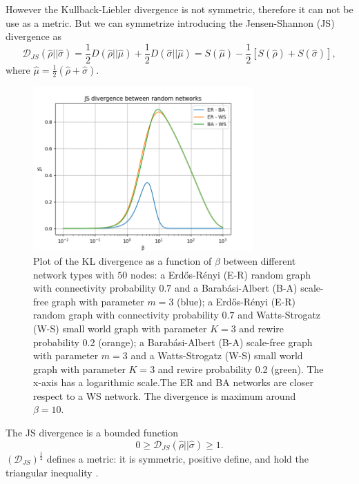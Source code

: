 However the Kullback-Liebler divergence is not symmetric, therefore it can not be use as a metric. 
But we can symmetrize introducing the Jensen-Shannon (JS) divergence \cite{J-S_divergence} as
\begin{equation}\label{JS_metric}
    \mathcal{D}_{JS}(\hat\rho||\hat\sigma) =  \frac{1}{2}D(\hat \rho || \hat \mu) + \frac{1}{2}D(\hat \sigma || \hat \mu) = S(\hat\mu)-\frac{1}{2}\left[S(\hat\rho) + S(\hat\sigma)\right],
\end{equation}
where $\hat\mu =\frac{1}{2}(\hat\rho+\hat\sigma)$. 
\begin{figure}[ht!]
    \centering
    \includegraphics[width=0.75\textwidth]{image/JS_divergence.png}
    \caption{Plot of the KL divergence as a function of $\beta$ between different network types with $50$ nodes: a Erd\H{o}s-Rényi (E-R) random graph with connectivity probability $0.7$ and a Barab\'asi-Albert (B-A) scale-free graph with parameter $m=3$ (blue); a Erd\H{o}s-Rényi (E-R) random graph with connectivity probability $0.7$ and Watts-Strogatz (W-S) small world graph with parameter $K=3$ and rewire probability 0.2 (orange); a Barab\'asi-Albert (B-A) scale-free graph with parameter $m=3$ and a Watts-Strogatz (W-S) small world graph with parameter $K=3$ and rewire probability 0.2 (green). The x-axis has a logarithmic scale.The ER and BA networks are closer respect to a WS network. The divergence is maximum around $\beta = 10$.}
    \label{Fig:JS_divergence}
\end{figure}

The JS divergence is a bounded function \cite{J-S_divergence}
\begin{equation}
    0 \geq \mathcal{D}_{JS}(\hat\rho||\hat\sigma) \geq 1.
\end{equation}
$\left(\mathcal{D}_{JS}\right)^{\frac{1}{2}}$ defines a metric: it is symmetric, positive define, and hold the triangular inequality \cite{Jensen-Shannon_divergence}. 

